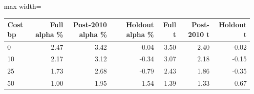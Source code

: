 \begin{adjustbox}{max width=\linewidth}
\begin{tabular}{lrrrrrr}
\toprule
Cost bp & Full alpha \% & Post-2010 alpha \% & Holdout alpha \% & Full t & Post-2010 t & Holdout t \\
\midrule
0 & 2.47 & 3.42 & -0.04 & 3.50 & 2.40 & -0.02 \\
10 & 2.17 & 3.12 & -0.34 & 3.07 & 2.18 & -0.15 \\
25 & 1.73 & 2.68 & -0.79 & 2.43 & 1.86 & -0.35 \\
50 & 1.00 & 1.95 & -1.54 & 1.39 & 1.33 & -0.67 \\
\bottomrule
\end{tabular}
\end{adjustbox}
\par{}

